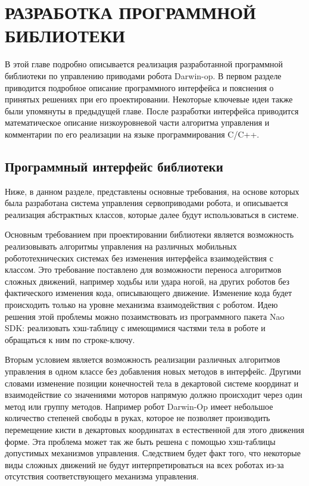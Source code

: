 \chapter{РАЗРАБОТКА ПРОГРАММНОЙ БИБЛИОТЕКИ}

В этой главе подробно описывается реализация разработанной программной библиотеки по управлению приводами робота Darwin-op. В первом разделе приводится подробное описание программного интерфейса и пояснения о принятых решениях при его проектировании. Некоторые ключевые идеи также были упомянуты в предыдущей главе. После разработки интерфейса приводится математическое описание низкоуровневой части алгоритма управления и комментарии по его реализации на языке программирования C/C++.

\section{Программный интерфейс библиотеки}

Ниже, в данном разделе, представлены основные требования, на основе которых была разработана система управления сервоприводами робота, и описывается реализация абстрактных классов, которые далее будут использоваться в системе.

Основным требованием при проектировании библиотеки является возможность реализовывать алгоритмы управления на различных мобильных робототехнических системах без изменения интерфейса взаимодействия с классом. Это требование поставлено для возможности переноса  алгоритмов сложных движений, например ходьбы или удара ногой, на других роботов без фактического изменения кода, описывающего движение. Изменение кода будет происходить только на уровне механизма взаимодействия с роботом. Идею решения этой проблемы можно позаимствовать из программного пакета Nao SDK: реализовать хэш-таблицу с имеющимися частями тела в роботе и обращаться к ним по строке-ключу.

Вторым условием является возможность реализации различных алгоритмов управления в одном классе без добавления новых методов в интерфейс. Другими словами изменение позиции конечностей тела в декартовой системе координат и взаимодействие со значениями моторов напрямую должно происходит через один метод или группу методов. Например робот Darwin-Op имеет небольшое количество степеней свободы в руках, которое не позволяет производить перемещение кисти в декартовых координатах в естественной для этого движения форме. Эта проблема может так же быть решена с помощью хэш-таблицы допустимых механизмов управления. Следствием будет факт того, что некоторые виды сложных движений не будут интерпретироваться на всех роботах из-за отсутствия соответствующего механизма управления.

